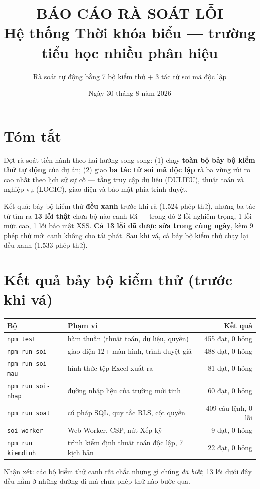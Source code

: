 \documentclass[12pt,a4paper]{article}
\title{\textbf{BÁO CÁO RÀ SOÁT LỖI}\\[4pt]
\large Hệ thống Thời khóa biểu --- trường tiểu học nhiều phân hiệu}
\author{Rà soát tự động bằng 7 bộ kiểm thử + 3 tác tử soi mã độc lập}
\date{Ngày 30 tháng 8 năm 2026}
\newcommand{\muc}[1]{\textbf{#1}}
\begin{document}
\maketitle

\section*{Tóm tắt}
Đợt rà soát tiến hành theo hai hướng song song: (1) chạy \textbf{toàn bộ bảy bộ
kiểm thử tự động} của dự án; (2) giao \textbf{ba tác tử soi mã độc lập} rà ba
vùng rủi ro cao nhất theo lịch sử sự cố --- tầng truy cập dữ liệu (DULIEU),
thuật toán và nghiệp vụ (LOGIC), giao diện và bảo mật phía trình duyệt.

Kết quả: bảy bộ kiểm thử \textbf{đều xanh} trước khi rà (1.524 phép thử), nhưng
ba tác tử tìm ra \textbf{13 lỗi thật} chưa bộ nào canh tới --- trong đó 2 lỗi
nghiêm trọng, 1 lỗi mức cao, 1 lỗi bảo mật XSS. \textbf{Cả 13 lỗi đã được sửa
trong cùng ngày}, kèm 9 phép thử mới canh không cho tái phát. Sau khi vá, cả
bảy bộ kiểm thử chạy lại đều xanh (1.533 phép thử).

\section{Kết quả bảy bộ kiểm thử (trước khi vá)}
\begin{longtable}{@{}llr@{}}
\toprule
\muc{Bộ} & \muc{Phạm vi} & \muc{Kết quả}\\
\midrule
\texttt{npm test}          & hàm thuần (thuật toán, dữ liệu, quyền)      & 455 đạt, 0 hỏng\\
\texttt{npm run soi}       & giao diện 12+ màn hình, trình duyệt giả      & 488 đạt, 0 hỏng\\
\texttt{npm run soi-mau}   & hình thức tệp Excel xuất ra                  & 81 đạt, 0 hỏng\\
\texttt{npm run soi-nhap}  & đường nhập liệu của trường mới tinh          & 60 đạt, 0 hỏng\\
\texttt{npm run soat}      & cú pháp SQL, quy tắc RLS, cột quyền          & 409 câu lệnh, 0 lỗi\\
\texttt{soi-worker}        & Web Worker, CSP, nút Xếp kỹ                  & 9 đạt, 0 hỏng\\
\texttt{npm run kiemdinh}  & trình kiểm định thuật toán độc lập, 7 kịch bản & 22 đạt, 0 hỏng\\
\bottomrule
\end{longtable}

Nhận xét: các bộ kiểm thử canh rất chắc những gì chúng \emph{đã biết}; 13 lỗi
dưới đây đều nằm ở những đường đi mà chưa phép thử nào bước qua.
\end{document}
